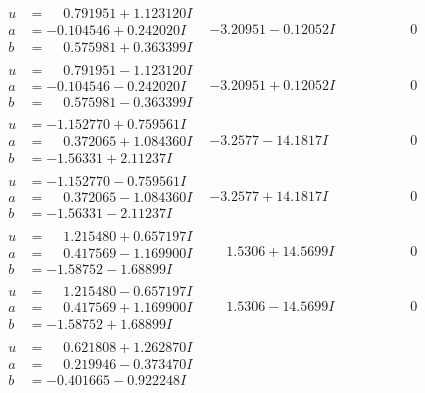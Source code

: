 \documentclass[1p]{elsarticle_modified}
\theoremstyle{definition}
\begin{document}
$$\begin{array}{c|c|c}
\begin{aligned}
u &= \phantom{-}0.791951 + 1.123120 I \\
a &= -0.104546 + 0.242020 I \\
b &= \phantom{-}0.575981 + 0.363399 I\end{aligned}
 & -3.20951 - 0.12052 I & \phantom{-0.000000 } 0 \\ \hline\begin{aligned}
u &= \phantom{-}0.791951 - 1.123120 I \\
a &= -0.104546 - 0.242020 I \\
b &= \phantom{-}0.575981 - 0.363399 I\end{aligned}
 & -3.20951 + 0.12052 I & \phantom{-0.000000 } 0 \\ \hline\begin{aligned}
u &= -1.152770 + 0.759561 I \\
a &= \phantom{-}0.372065 + 1.084360 I \\
b &= -1.56331 + 2.11237 I\end{aligned}
 & -3.2577 - 14.1817 I & \phantom{-0.000000 } 0 \\ \hline\begin{aligned}
u &= -1.152770 - 0.759561 I \\
a &= \phantom{-}0.372065 - 1.084360 I \\
b &= -1.56331 - 2.11237 I\end{aligned}
 & -3.2577 + 14.1817 I & \phantom{-0.000000 } 0 \\ \hline\begin{aligned}
u &= \phantom{-}1.215480 + 0.657197 I \\
a &= \phantom{-}0.417569 - 1.169900 I \\
b &= -1.58752 - 1.68899 I\end{aligned}
 & \phantom{-}1.5306 + 14.5699 I & \phantom{-0.000000 } 0 \\ \hline\begin{aligned}
u &= \phantom{-}1.215480 - 0.657197 I \\
a &= \phantom{-}0.417569 + 1.169900 I \\
b &= -1.58752 + 1.68899 I\end{aligned}
 & \phantom{-}1.5306 - 14.5699 I & \phantom{-0.000000 } 0 \\ \hline\begin{aligned}
u &= \phantom{-}0.621808 + 1.262870 I \\
a &= \phantom{-}0.219946 - 0.373470 I \\
b &= -0.401665 - 0.922248 I\end{aligned}

\end{array}$$
\end{document}
